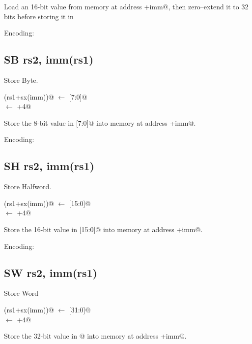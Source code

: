 Load an 16-bit value from memory at address +imm@, then 
zero--extend it to 32 bits before storing it in \verb@rd@

Encoding:


\subsection{SB rs2, imm(rs1)}

Store Byte.

(rs1+sx(imm))@ $\leftarrow$ [7:0]@\\
\verb@pc@ $\leftarrow$ \verb@pc+4@

Store the 8-bit value in [7:0]@ into memory at 
address +imm@.

Encoding:


\subsection{SH rs2, imm(rs1)}

Store Halfword.

(rs1+sx(imm))@ $\leftarrow$ [15:0]@\\
\verb@pc@ $\leftarrow$ \verb@pc+4@

Store the 16-bit value in [15:0]@ into memory at 
address +imm@.


Encoding:


\subsection{SW rs2, imm(rs1)}

Store Word

(rs1+sx(imm))@ $\leftarrow$ [31:0]@\\
\verb@pc@ $\leftarrow$ \verb@pc+4@

Store the 32-bit value in @ into memory at address +imm@.

